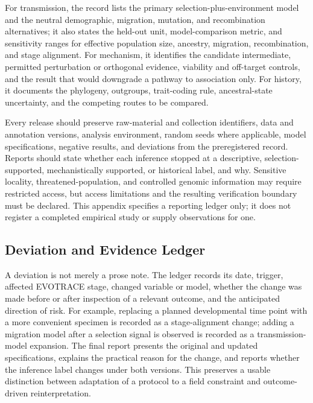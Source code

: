 \documentclass[conference]{IEEEtran}
\begin{document}
For transmission, the record lists the primary selection-plus-environment model and the neutral demographic, migration, mutation, and recombination alternatives; it also states the held-out unit, model-comparison metric, and sensitivity ranges for effective population size, ancestry, migration, recombination, and stage alignment. For mechanism, it identifies the candidate intermediate, permitted perturbation or orthogonal evidence, viability and off-target controls, and the result that would downgrade a pathway to association only. For history, it documents the phylogeny, outgroups, trait-coding rule, ancestral-state uncertainty, and the competing routes to be compared.

Every release should preserve raw-material and collection identifiers, data and annotation versions, analysis environment, random seeds where applicable, model specifications, negative results, and deviations from the preregistered record. Reports should state whether each inference stopped at a descriptive, selection-supported, mechanistically supported, or historical label, and why. Sensitive locality, threatened-population, and controlled genomic information may require restricted access, but access limitations and the resulting verification boundary must be declared. This appendix specifies a reporting ledger only; it does not register a completed empirical study or supply observations for one.

\subsection{Deviation and Evidence Ledger}

A deviation is not merely a prose note. The ledger records its date, trigger, affected EVOTRACE stage, changed variable or model, whether the change was made before or after inspection of a relevant outcome, and the anticipated direction of risk. For example, replacing a planned developmental time point with a more convenient specimen is recorded as a stage-alignment change; adding a migration model after a selection signal is observed is recorded as a transmission-model expansion. The final report presents the original and updated specifications, explains the practical reason for the change, and reports whether the inference label changes under both versions. This preserves a usable distinction between adaptation of a protocol to a field constraint and outcome-driven reinterpretation.
\end{document}
